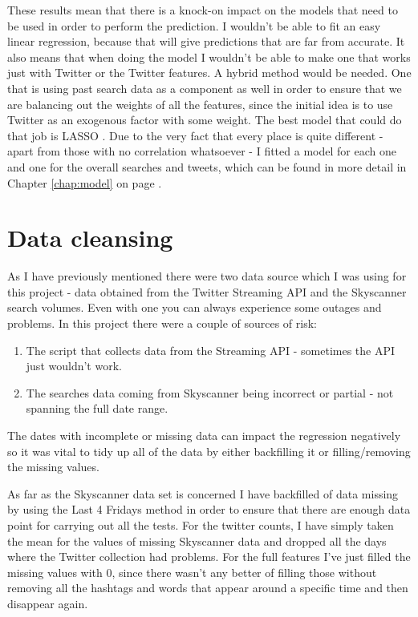 \documentclass[minf,frontabs,twoside,singlespacing,parskip]{infthesis}
\begin{document}
These results mean that there is a knock-on impact on the models that need to be used in order to perform the prediction. I wouldn't be able to fit an easy linear regression, because that will give predictions that are far from accurate. It also means that when doing the model I wouldn't be able to make one that works just with Twitter or the Twitter features. A hybrid method would be needed. One that is using past search data as a component as well in order to ensure that we are balancing out the weights of all the features, since the initial idea is to use Twitter as an exogenous factor with some weight. The best model that could do that job is LASSO \cite{lasso}. Due to the very fact that every place is quite different - apart from those with no correlation whatsoever - I fitted a model for each one and one for the overall searches and tweets, which can be found in more detail in Chapter \ref{chap:model} on page \pageref{chap:model}.


\section{Data cleansing}
\label{sec:cleansing}


As I have previously mentioned there were two data source which I was using for this project - data obtained from the Twitter Streaming API and the Skyscanner search volumes. Even with one you can always experience some outages and problems. In this project there were a couple of sources of risk:
\begin{enumerate}
\item The script that collects data from the Streaming API - sometimes the API just wouldn't work. 
\item The searches data coming from Skyscanner being incorrect or partial - not spanning the full date range.
\end{enumerate}


The dates with incomplete or missing data can impact the regression negatively so it was vital to tidy up all of the data by either backfilling it or filling/removing the missing values. 

As far as the Skyscanner data set is concerned I have backfilled of data missing by using the Last 4 Fridays method in order to ensure that there are enough data point for carrying out all the tests. For the twitter counts, I have simply taken the mean for the values of missing Skyscanner data and dropped all the days where the Twitter collection had problems. For the full features I've just filled the missing values with 0, since there wasn't any better of filling those without removing all the hashtags and words that appear around a specific time and then disappear again.
\end{document}
